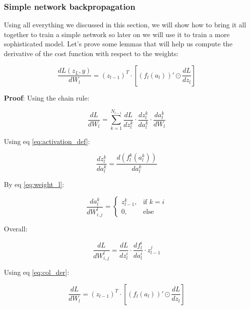 \subsubsection{Simple network backpropagation}
Using all everything we discussed in this section, we will show how to bring it all together to train a simple network so later on we will use it to train a more sophisticated model.
Let's prove some lemmas that will help us compute the derivative of the cost function with respect to the weights:

\begin{mdframed}[backgroundcolor=blue_background, linecolor=black, linewidth=2pt, frametitle=\textbf{Lemma}]
\begin{center}
\begin{equation} \label{lemma:simple_derivative}
    \frac{dL(z_L, y)}{dW_l} = (z_{l-1})^T \cdot [(f_l(a_l))' \odot \frac{dL}{dz_l}]
\end{equation}
\end{center}
\end{mdframed}

\textbf{Proof}:
Using the chain rule:

\begin{equation} \label{eq:BP-chain-rule}
    \frac{dL}{dW_l} = \sum_{k=1}^{N_{l-1}} \frac{dL}{dz_l^k} \cdot \frac{dz_l^k}{da_l^k} \cdot \frac{da_l^k}{dW_l}
\end{equation}

Using eq \ref{eq:activation_def}:

\begin{equation}
    \frac{dz_l^k}{da_l^k} = \frac{d(f_l^k(a_l^k))}{da_l^k}
\end{equation}

By eq \ref{eq:weight_l}:

\begin{equation}
    \frac{da_l^k}{dW_{i,j}^l} = \begin{cases} z_{l-1}^k, & \text{if } k=i \\ 0, & \text{else} \end{cases}
\end{equation}

Overall:

\begin{equation}
    \frac{dL}{dW_{i,j}^l} = \frac{dL}{dz_l^i} \cdot \frac{df_l^i}{da_l^i} \cdot z_{l-1}^j
\end{equation}

Using eq \ref{eq:col_der}:

\begin{equation}
    \frac{dL}{dW_l} = (z_{l-1})^T \cdot [(f_l(a_l))' \odot \frac{dL}{dz_l}]
\end{equation}


